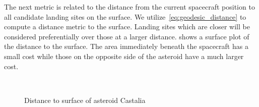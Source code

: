 The next metric is related to the distance from the current spacecraft position to all candidate landing sites on the surface.
We utilize~\cref{eq:geodesic_distance} to compute a distance metric to the surface.
Landing sites which are closer will be considered preferentially over those at a larger distance.
 shows a surface plot of the distance to the surface. 
The area immediately beneath the spacecraft has a small cost while those on the opposite side of the asteroid have a much larger cost.
\begin{figure}[htbp]
    \centering
    \\%
    \caption{Distance to surface of asteroid Castalia\label{fig:distance_castalia_both}}
\end{figure}
